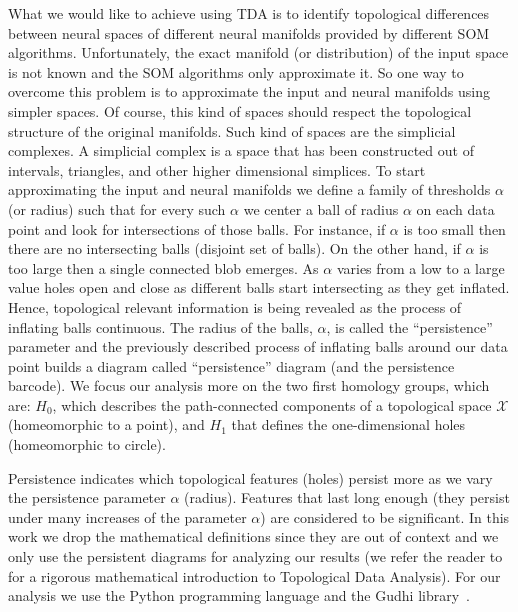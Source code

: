\documentclass[10pt]{article}
\theoremstyle{definition}
\begin{document}
What we would like to achieve using TDA is to identify topological differences 
between neural spaces of different neural manifolds provided by different
SOM algorithms. Unfortunately, the exact manifold (or distribution) of the
input space is not known and the SOM algorithms only approximate it. So one 
way to overcome this problem is to approximate the input and neural manifolds
using simpler spaces. Of course, this kind of spaces should respect the
topological structure of the original manifolds. Such kind of spaces are the
simplicial complexes. A simplicial complex is a space that has been constructed
out of intervals, triangles, and other higher dimensional simplices. To start
approximating the input and neural manifolds we define a family of thresholds
$\alpha$ (or radius) such that for every such $\alpha$ we center a ball of
radius $\alpha$ on each data point and look for intersections of those balls.
For instance, if $\alpha$ is too small then there are no intersecting balls 
(disjoint set of balls). On the other hand, if $\alpha$ is too large then 
a single connected blob emerges. As $\alpha$ varies from a low to a large 
value holes open and close as different balls start intersecting as they 
get inflated. Hence, topological relevant information is being revealed as 
the process of inflating balls continuous. The radius of the balls,
$\alpha$, is called the ``persistence'' parameter and the previously described 
process of inflating balls around our data point builds a diagram 
called ``persistence'' diagram (and the persistence barcode). 
We focus our analysis more on the two first homology groups, which are:
$H_0$, which describes the path-connected components of a topological space 
$\mathcal{X}$ (homeomorphic to a point), and $H_1$ that defines the 
one-dimensional holes (homeomorphic to circle).

Persistence indicates which topological features (holes) persist more as 
we vary the persistence parameter $\alpha$ (radius). Features that last long
enough (they persist under many increases of the parameter $\alpha$) are
considered to be significant. In this work we drop the mathematical definitions
since they are out of context and we only use the persistent diagrams for 
analyzing our results (we refer the reader
to~\cite{chazal:2017,ghrist:2008,zomorodian:2005} for a rigorous mathematical
introduction to Topological Data Analysis). For our analysis we use the Python
programming language and the Gudhi library~\cite{maria:2014}.
\end{document}
